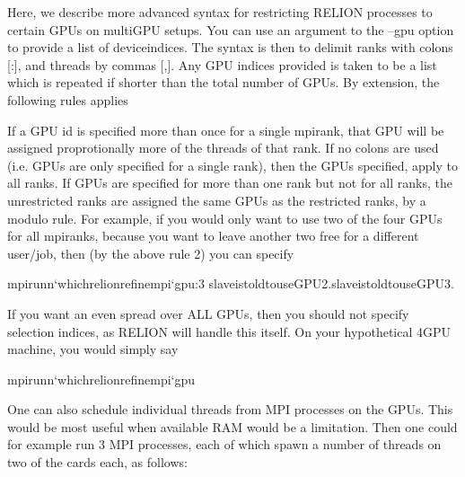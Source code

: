 \documentclass[a4paper,10pt,english]{sphinxmanual}
\begin{document}
\sphinxAtStartPar
Here, we describe more advanced syntax for restricting RELION processes to certain GPUs on multi\sphinxhyphen{}GPU setups. You can use an argument to the –gpu option to provide a list of device\sphinxhyphen{}indices. The syntax is then to delimit ranks with colons {[}:{]}, and threads by commas {[},{]}. Any GPU indices provided is taken to be a list which is repeated if shorter than the total number of GPUs. By extension, the following rules applies

\sphinxAtStartPar
If a GPU id is specified more than once for a single mpi\sphinxhyphen{}rank, that GPU will be assigned proprotionally more of the threads of that rank.
If no colons are used (i.e. GPUs are only specified for a single rank), then the GPUs specified, apply to all ranks.
If GPUs are specified for more than one rank but not for all ranks, the unrestricted ranks are assigned the same GPUs as the restricted ranks, by a modulo rule.
For example, if you would only want to use two of the four GPUs for all mpi\sphinxhyphen{}ranks, because you want to leave another two free for a different user/job, then (by the above rule 2) you can specify

\begin{sphinxVerbatim}[commandchars=\\\{\}]
mpirun\PYGZhy{}n‘whichrelion\PYGZus{}refine\PYGZus{}mpi‘\PYGZhy{}\PYGZhy{}gpu:3
slaveistoldtouseGPU2.slaveistoldtouseGPU3.
\end{sphinxVerbatim}

\sphinxAtStartPar
If you want an even spread over ALL GPUs, then you should not specify selection indices, as RELION will handle this itself. On your hypothetical 4\sphinxhyphen{}GPU machine, you would simply say

\begin{sphinxVerbatim}[commandchars=\\\{\}]
mpirun\PYGZhy{}n‘whichrelion\PYGZus{}refine\PYGZus{}mpi‘\PYGZhy{}\PYGZhy{}gpu
\end{sphinxVerbatim}

\sphinxAtStartPar
One can also schedule individual threads from MPI processes on the GPUs. This would be most useful when available RAM would be a limitation. Then one could for example run 3 MPI processes, each of which spawn a number of threads on two of the cards each, as follows:
\end{document}
